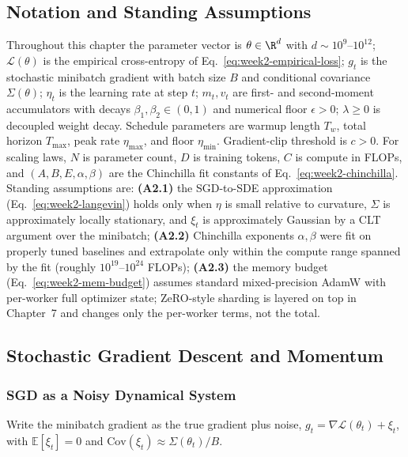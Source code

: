 \subsection{Notation and Standing Assumptions}
\label{sec:week2-notation}

\begin{notationbox}
Throughout this chapter the parameter vector is
$\theta \in \R^{d}$ with $d \sim 10^{9}$--$10^{12}$; $\mathcal{L}(\theta)$
is the empirical cross-entropy of Eq.~\eqref{eq:week2-empirical-loss};
$g_t$ is the stochastic minibatch gradient with batch size $B$ and
conditional covariance $\Sigma(\theta)$; $\eta_t$ is the learning rate
at step $t$; $m_t, v_t$ are first- and second-moment accumulators with
decays $\beta_1, \beta_2 \in (0,1)$ and numerical floor
$\epsilon > 0$; $\lambda \ge 0$ is decoupled weight decay. Schedule
parameters are warmup length $T_w$, total horizon $T_{\max}$, peak
rate $\eta_{\max}$, and floor $\eta_{\min}$. Gradient-clip threshold
is $c > 0$. For scaling laws, $N$ is parameter count, $D$ is training
tokens, $C$ is compute in FLOPs, and $(A, B, E, \alpha, \beta)$ are
the Chinchilla fit constants of Eq.~\eqref{eq:week2-chinchilla}.
Standing assumptions are:
\textbf{(A2.1)} the SGD-to-SDE approximation
(Eq.~\eqref{eq:week2-langevin}) holds only when $\eta$ is small
relative to curvature, $\Sigma$ is approximately locally stationary,
and $\xi_t$ is approximately Gaussian by a CLT argument over the
minibatch;
\textbf{(A2.2)} Chinchilla exponents $\alpha, \beta$ were fit on
properly tuned baselines and extrapolate only within the compute range
spanned by the fit (roughly $10^{19}$--$10^{24}$ FLOPs);
\textbf{(A2.3)} the memory budget
(Eq.~\eqref{eq:week2-mem-budget}) assumes standard mixed-precision
AdamW with per-worker full optimizer state; ZeRO-style sharding is
layered on top in Chapter~7 and changes only the per-worker terms, not
the total.
\end{notationbox}

\subsection{Stochastic Gradient Descent and Momentum}

\subsubsection{SGD as a Noisy Dynamical System}

Write the minibatch gradient as the true gradient plus noise,
$g_t = \nabla \mathcal{L}(\theta_t) + \xi_t$, with
$\mathbb{E}[\xi_t]=0$ and $\mathrm{Cov}(\xi_t) \approx \Sigma(\theta_t)/B$.

